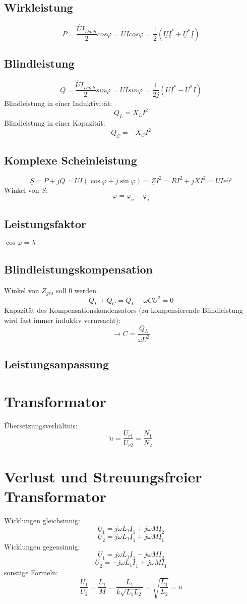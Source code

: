 \documentclass[12pt,a4paper]{article}
\begin{document}
\subsection{Wirkleistung}
\[P = \frac{\hat{U}I_{Dach}}{2}cos\varphi = UIcos\varphi = \frac{1}{2}(\underline{U}\underline{I}^* + \underline{U}^* \underline{I})\]

\subsection{Blindleistung}
\[Q = \frac{\hat{U}I_{Dach}}{2}sin\varphi = UIsin \varphi = \frac{1}{2j}(\underline{U}\underline{I}^* - \underline{U}^* \underline{I})\]
Blindleistung in einer Induktivität:
\[Q_L = X_L I^2\]
Blindleistung in einer Kapazität:
\[Q_C = -X_C I^2\]

\subsection{Komplexe Scheinleistung}
\[\underline{S} = P + jQ = UI(\cos\varphi + j\sin\varphi) = \underline{Z} I^2 = RI^2+jXI^2 = UIe^{j\varphi}\]
Winkel von $\underline{S}$:
\[\varphi = \varphi_u - \varphi_i\]

\subsection{Leistungsfaktor}
$\cos \varphi = \lambda$

\subsection{Blindleistungskompensation}
Winkel von $Z_{ges}$ soll $0$ werden.
\[Q_L + Q_C = Q_L - \omega CU^2 = 0\]
Kapazität des Kompensationskondensators (zu kompensierende Blindleistung wird fast immer induktiv verursacht):
\[\rightarrow C = \frac{Q_L}{\omega U^2}\]

\subsection{Leistungsanpassung}
\section{Transformator}
Übersetzungsverhältnis:\\
\[\ddot{u} = \frac{U_{r1}}{U_{r2}} = \frac{N_1}{N_2}\]

\section{Verlust und Streuungsfreier Transformator}
Wicklungen gleichsinnig:
\[\underline{U}_1 = j\omega L_1 \underline{I}_1 + j \omega M \underline{I}_2\]
\[\underline{U}_2 = j\omega L_1 \underline{I}_1 + j \omega M \underline{I}_1\]
Wicklungen gegensinnig:
\[\underline{U}_1 = j\omega L_1 \underline{I}_1 - j \omega M \underline{I}_2\]
\[\underline{U}_2 = - j\omega L_1 \underline{I}_1 + j \omega M \underline{I}_1\]
sonstige Formeln:
\[\frac{U_1}{U_2} = \frac{L_1}{M} = \frac{L_1}{k\sqrt{L_1 L_2}} = \sqrt{\frac{L_1}{L_2}} = \ddot{u}\]
\end{document}
